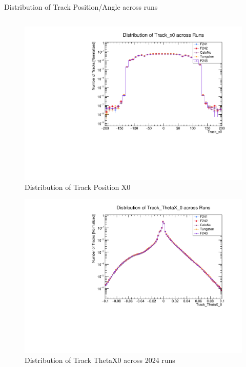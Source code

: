 \begin{frame}{Distribution of Track Position/Angle across runs}
	\begin{columns}
		\begin{column}{0.5\linewidth}
			\vspace{-0.4cm}
			\begin{figure}
				\includegraphics[width=\linewidth]{./RunwisePlots/Track_x0_runwise.pdf}
				\caption{Distribution of Track Position X0}
			\end{figure}
			\vspace{-1cm}
			\begin{figure}
				\includegraphics[width=\linewidth]{./RunwisePlots/Track_ThetaX_0_runwise.pdf}
				\caption{Distribution of Track ThetaX0 across 2024 runs}
			\end{figure}

\end{column}
\end{columns}
\end{frame}
